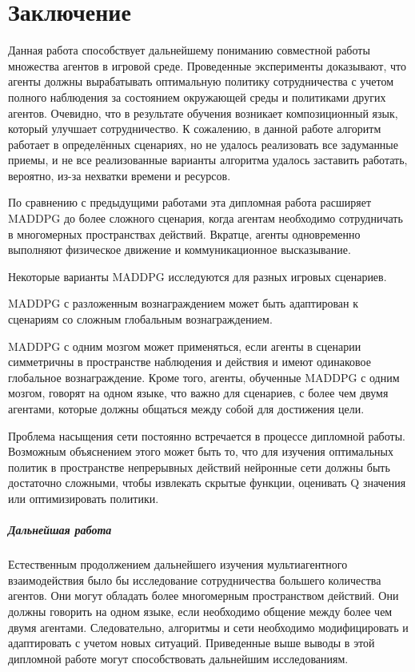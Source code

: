\chapter*{Заключение} \label{ch-conclusion}

Данная работа способствует дальнейшему пониманию совместной работы множества агентов в игровой среде. Проведенные эксперименты доказывают, что агенты должны вырабатывать оптимальную политику сотрудничества с учетом полного наблюдения за состоянием окружающей среды и политиками других агентов. Очевидно, что в результате обучения возникает композиционный язык, который улучшает сотрудничество. К сожалению, в данной работе алгоритм работает в определённых сценариях, но не удалось реализовать все задуманные приемы, и не все реализованные варианты алгоритма удалось заставить работать, вероятно, из-за нехватки времени и ресурсов.

По сравнению с предыдущими работами эта дипломная работа расширяет MADDPG до более сложного сценария, когда агентам необходимо сотрудничать в многомерных пространствах действий. Вкратце, агенты одновременно выполняют физическое движение и коммуникационное высказывание.

Некоторые варианты MADDPG исследуются для разных игровых сценариев.

MADDPG с разложенным вознаграждением может быть адаптирован к сценариям со сложным глобальным вознаграждением.

MADDPG с одним мозгом может применяться, если агенты в сценарии симметричны в пространстве наблюдения и действия и имеют одинаковое глобальное вознаграждение. Кроме того, агенты, обученные MADDPG с одним мозгом, говорят на одном языке, что важно для сценариев, с более чем двумя агентами, которые должны общаться между собой для достижения цели.

Проблема насыщения сети постоянно встречается в процессе дипломной работы. Возможным объяснением этого может быть то, что для изучения оптимальных политик в пространстве непрерывных действий нейронные сети должны быть достаточно сложными, чтобы извлекать скрытые функции, оценивать Q значения или оптимизировать политики.

\paragraph{Дальнейшая работа}
Естественным продолжением дальнейшего изучения мультиагентного взаимодействия было бы исследование сотрудничества большего количества агентов. Они могут обладать более многомерным пространством действий. Они должны говорить на одном языке, если необходимо общение между более чем двумя агентами. Следовательно, алгоритмы и сети необходимо модифицировать и адаптировать с учетом новых ситуаций. Приведенные выше выводы в этой дипломной работе могут способствовать дальнейшим исследованиям.

